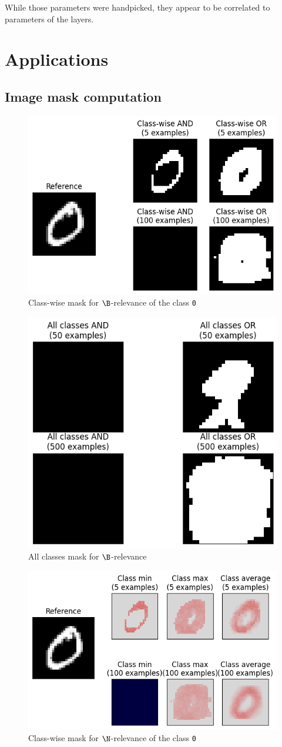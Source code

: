 \documentclass{../cs-classes/cs-classes}
\newcommand*{\1}{\digitsbb{1}}
\newcommand*{\0}{\digitsbb{0}}
\begin{document}
While those parameters were handpicked, they appear to be correlated to parameters of the layers.

\section{Applications}
\subsection{Image mask computation} 
\begin{figure}[H]
    \centering
    \includegraphics[width=.5\textwidth]{boolean-mask.png}
    \caption{Class-wise mask for $\B$-relevance of the class \texttt{0}}
\end{figure}

\begin{figure}[H]
    \centering
    \includegraphics[width=.5\textwidth]{boolean-mask-all.png}
    \caption{All classes mask for $\B$-relevance}
\end{figure}

\begin{figure}[H]
    \centering
    \includegraphics[width=.5\textwidth]{counting-mask.png}
    \caption{Class-wise mask for $\N$-relevance of the class \texttt{0}}
\end{figure}
\end{document}
